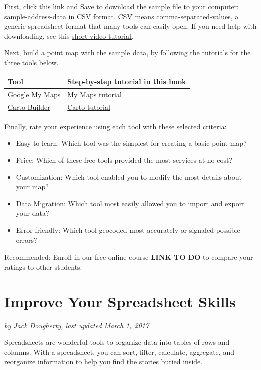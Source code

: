 \documentclass[
  english,
]{book}
\providecommand{\tightlist}{%
  \setlength{\itemsep}{0pt}\setlength{\parskip}{0pt}}
\begin{document}
First, click this link and Save to download the sample file to your computer: \href{data/sample-address-data.csv}{sample-address-data in CSV format}. CSV means comma-separated-values, a generic spreadsheet format that many tools can easily open. If you need help with downloading, see this \href{https://www.youtube.com/watch?v=-04PQldP9HQ}{short video tutorial}.

Next, build a point map with the sample data, by following the tutorials for the three tools below.

\begin{longtable}[]{@{}ll@{}}
\toprule
Tool & Step-by-step tutorial in this book\tabularnewline
\midrule
\endhead
\href{https://www.google.com/maps/d/}{Google My Maps} & \href{mymaps}{My Maps tutorial}\tabularnewline
\href{http://carto.com}{Carto Builder} & \href{carto}{Carto tutorial}\tabularnewline
\bottomrule
\end{longtable}

Finally, rate your experience using each tool with these selected criteria:

\begin{itemize}
\tightlist
\item
  Easy-to-learn: Which tool was the simplest for creating a basic point map?
\item
  Price: Which of these free tools provided the most services at no cost?
\item
  Customization: Which tool enabled you to modify the most details about your map?
\item
  Data Migration: Which tool most easily allowed you to import and export your data?
\item
  Error-friendly: Which tool geocoded most accurately or signaled possible errors?
\end{itemize}

Recommended: Enroll in our free online course \textbf{LINK TO DO} to compare your ratings to other students.

\hypertarget{spreadsheet}{%
\chapter{Improve Your Spreadsheet Skills}\label{spreadsheet}}

\emph{by \href{authors}{Jack Dougherty}, last updated March 1, 2017}

Spreadsheets are wonderful tools to organize data into tables of rows and columns. With a spreadsheet, you can sort, filter, calculate, aggregate, and reorganize information to help you find the stories buried inside.
\end{document}
